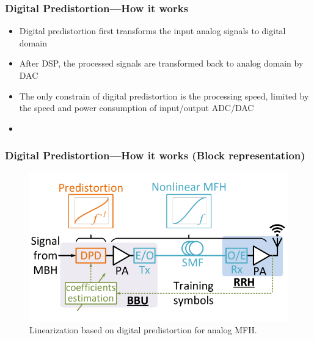 \documentclass[t]{beamer}
\begin{document}
\begin{frame}
    \frametitle{Digital Predistortion---How it works}
    \begin{itemize}
        \item Digital predistortion first transforms the input analog signals to digital domain
        \item After DSP, the processed signals are transformed back to analog domain by DAC
        \item The only constrain of digital predistortion is the processing speed, limited by the speed and power consumption of input/output ADC/DAC
        \item 
    \end{itemize}
\end{frame}

\begin{frame}
    \frametitle{Digital Predistortion---How it works (Block representation)~\cite{Wang2017}}
    \begin{figure}\label{predistortion}
        \includegraphics[width=\textwidth]{predistortion}
        \caption{Linearization based on digital predistortion for analog MFH.}
    \end{figure}
\end{frame}
\end{document}
